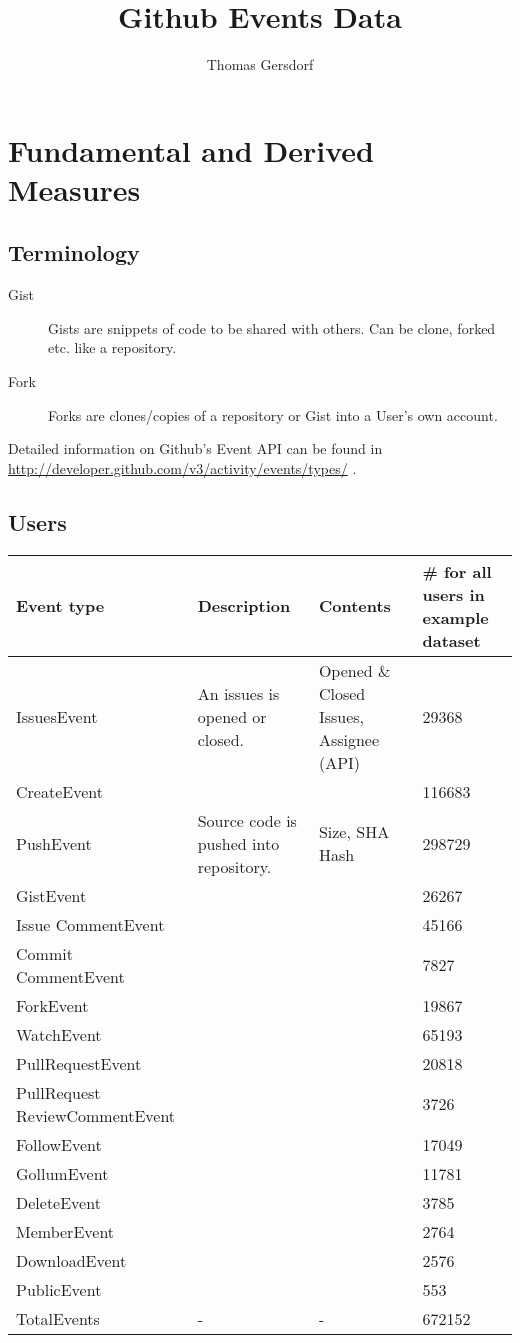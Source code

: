\documentclass[a4paper,10pt]{article}
\title{Github Events Data}
\author{Thomas Gersdorf}
\begin{document}
\maketitle


\section{Fundamental and Derived Measures}
\subsection{Terminology}
\begin{description}
 \item[Gist] Gists are snippets of code to be shared with others. Can be clone, forked etc. like a repository.
\item [Fork] Forks are clones/copies of a repository or Gist into a User's own account.
\end{description}

Detailed information on Github's Event API can be found in \url{http://developer.github.com/v3/activity/events/types/} .

\subsection{Users}

\begin{tabular}{|p{2.5cm}|p{4cm}|p{4cm}|p{2cm}|}\hline
\textbf{Event type} & \textbf{Description}&  \textbf{Contents}& \textbf{\#  for all users in example dataset} \\\hline
 IssuesEvent  & An issues is opened or closed.   &  Opened \& Closed Issues, Assignee (API) &29368\\\hline
CreateEvent    &    & &  116683\\\hline
PushEvent  & Source code is pushed into repository. &  Size, SHA Hash &  298729\\\hline
GistEvent   &    &   &  26267\\\hline
Issue
CommentEvent &    &    &   45166\\\hline
Commit
CommentEvent &    &    &  7827\\\hline
ForkEvent   &    &    & 19867\\\hline
WatchEvent  &  &    &   65193\\\hline
PullRequestEvent     &    &  &  20818\\\hline
PullRequest
ReviewCommentEvent  & && 3726\\\hline
FollowEvent   &    &  & 17049\\\hline
GollumEvent  &    &  &  11781\\\hline
DeleteEvent   &    &  &   3785\\\hline
MemberEvent   &    & &    2764\\\hline
DownloadEvent  &    & & 2576\\\hline
PublicEvent &  &    &  553\\\hline
TotalEvents & - & - & 672152 \\\hline
\end{tabular}
\end{document}
